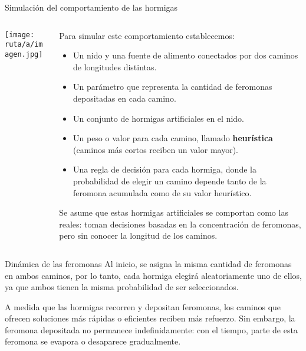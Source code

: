 \documentclass{beamer}
\begin{document}
\begin{frame}{Simulación del comportamiento de las hormigas}
\begin{columns}
    \begin{column}{0.35\textwidth}
        \centering
        \texttt{[image: ruta/a/imagen.jpg]} %
    \end{column}

    \begin{column}{0.65\textwidth}
        \justifying
        Para simular este comportamiento establecemos:
        \begin{itemize}
            \item Un nido y una fuente de alimento conectados por dos caminos de longitudes distintas.
            \item Un parámetro que representa la cantidad de feromonas depositadas en cada camino.
            \item Un conjunto de hormigas artificiales en el nido.
            \item Un peso o valor para cada camino, llamado \textbf{heurística} (caminos más cortos reciben un valor mayor).
            \item Una regla de decisión para cada hormiga, donde la probabilidad de elegir un camino depende tanto de la feromona acumulada como de su valor heurístico.
        \end{itemize}
        Se asume que estas hormigas artificiales se comportan como las reales: toman decisiones basadas en la concentración de feromonas, pero sin conocer la longitud de los caminos.
    \end{column}
\end{columns}
\end{frame}

\begin{frame}{Dinámica de las feromonas}
\justifying
Al inicio, se asigna la misma cantidad de feromonas en ambos caminos, por lo tanto, cada hormiga elegirá aleatoriamente uno de ellos, ya que ambos tienen la misma probabilidad de ser seleccionados.

A medida que las hormigas recorren y depositan feromonas, los caminos que ofrecen soluciones más rápidas o eficientes reciben más refuerzo. Sin embargo, la feromona depositada no permanece indefinidamente: con el tiempo, parte de esta feromona se evapora o desaparece gradualmente.
\end{frame}
\end{document}
